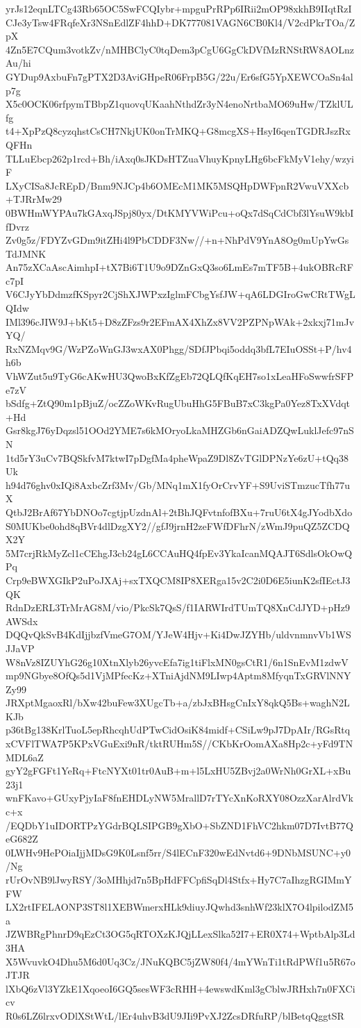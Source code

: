 yrJs12eqnLTCg43Rb65OC5SwFCQIybr+mpguPrRPp6IRii2mOP98xkhB9IIqtRzI
CJe3yTsw4FRqfeXr3NSnEdlZF4hhD+DK777081VAGN6CB0Kl4/V2cdPkrTOa/ZpX
4Zn5E7CQum3votkZv/nMHBClyC0tqDem3pCgU6GgCkDVfMzRNStRW8AOLnzAu/hi
GYDup9AxbuFn7gPTX2D3AviGHpeR06FrpB5G/22u/Er6sfG5YpXEWCOaSn4alp7g
X5c0OCK06rfpymTBbpZ1quovqUKaahNthdZr3yN4enoNrtbaMO69uHw/TZklULfg
t4+XpPzQ8cyzqhstCsCH7NkjUK0onTrMKQ+G8mcgXS+HsyI6qenTGDRJszRxQFHn
TLLuEbcp262p1rcd+Bh/iAxq0sJKDsHTZuaVhuyKpnyLHg6bcFkMyV1ehy/wzyiF
LXyCISa8JcREpD/Bnm9NJCp4b6OMEcM1MK5MSQHpDWFpnR2VwuVXXcb+TJRrMw29
0BWHmWYPAu7kGAxqJSpj80yx/DtKMYVWiPcu+oQx7dSqCdCbf3lYsuW9kbIfDvrz
Zv0g5z/FDYZvGDm9itZHi4l9PbCDDF3Nw//+n+NhPdV9YnA8Og0mUpYwGsTdJMNK
An75zXCaAscAimhpI+tX7Bi6T1U9o9DZnGxQ3so6LmEs7mTF5B+4ukOBRcRFc7pI
V6CJyYbDdmzfKSpyr2CjShXJWPxzIglmFCbgYsfJW+qA6LDGIroGwCRtTWgLQIdw
IMl396cJIW9J+bKt5+D8zZFzs9r2EFmAX4XhZx8VV2PZPNpWAk+2xkxj71mJvYQ/
RxNZMqv9G/WzPZoWnGJ3wxAX0Phgg/SDfJPbqi5oddq3bfL7EIuOSSt+P/hv4h6b
VhWZut5u9TyG6cAKwHU3QwoBxKfZgEb72QLQfKqEH7so1xLeaHFoSwwfrSFPe7zV
bSdfg+ZtQ90m1pBjuZ/ocZZoWKvRugUbuHhG5FBuB7xC3kgPa0Yez8TxXVdqt+Hd
Gsr8kgJ76yDqzsl51OOd2YME7s6kMOryoLkaMHZGb6nGaiADZQwLuklJefc97nSN
1td5rY3uCv7BQSkfvM7ktwI7pDgfMa4pheWpaZ9Dl8ZvTGlDPNzYe6zU+tQq38Uk
h94d76ghv0xIQi8AxbcZrf3Mv/Gb/MNq1mX1fyOrCrvYF+S9UviSTmzucTfh77uX
QtbJ2BrAf67YbDNOo7cgtjpUzdnAl+2tBhJQFvtnfofBXu+7ruU6tX4gJYodbXdo
S0MUKbe0ohd8qBVr4dlDzgXY2//gfJ9jrnH2zeFWfDFhrN/zWmJ9puQZ5ZCDQX2Y
5M7crjRkMyZcl1cCEhgJ3cb24gL6CCAuHQ4fpEv3YkaIcanMQAJT6SdlsOkOwQPq
Crp9eBWXGIkP2uPoJXAj+sxTXQCM8IP8XERga15v2C2i0D6E5iunK2sfIEctJ3QK
RdnDzERL3TrMrAG8M/vio/PkcSk7QsS/f1IARWIrdTUmTQ8XnCdJYD+pHz9AWSdx
DQQvQkSvB4KdIjjbzfVmeG7OM/YJeW4Hjv+Ki4DwJZYHb/uldvnmnvVb1WSJJaVP
W8nVz8IZUYhG26g10XtnXlyb26yvcEfa7ig1tiFlxMN0gsCtR1/6n1SnEvM1zdwV
mp9NGbye8OfQs5d1VjMPfecKz+XTniAjdNM9LIwp4Aptm8MfyqnTxGRVlNNYZy99
JRXptMgaoxRl/bXw42buFew3XUgcTb+a/zbJxBHsgCnIxY8qkQ5Bs+waghN2LKJb
p36tBg138KrlTuoL5epRhcqhUdPTwCidOsiK84midf+CSiLw9pJ7DpAIr/RGsRtq
xCVFlTWA7P5KPxVGuExi9nR/tktRUHm5S//CKbKrOomAXa8Hp2c+yFd9TNMDL6aZ
gyY2gFGFt1YeRq+FtcNYXt01tr0AuB+m+l5LxHU5ZBvj2a0WrNh0GrXL+xBu23j1
wnFKavo+GUxyPjyIaF8fnEHDLyNW5MrallD7rTYcXnKoRXY08OzzXarAlrdVkc+x
/EQDbY1uIDORTPzYGdrBQLSIPGB9gXbO+SbZND1FhVC2hkm07D7IvtB77QeG682Z
0LWHv9HePOiaIjjMDsG9K0Lsnf5rr/S4lECnF320wEdNvtd6+9DNbMSUNC+y0/Ng
rUrOvNB9lJwyRSY/3oMHhjd7n5BpHdFFCpfiSqDl4Stfx+Hy7C7aIhzgRGIMmYFW
LX2rtIFELAONP3ST8l1XEBWmerxHLk9diuyJQwhd3snhWf23klX7O4lpilodZM5a
JZWBRgPhnrD9qEzCt3OG5qRTOXzKJQjLLexSlka52I7+ER0X74+WptbAlp3Ld3HA
X5WvuvkO4Dhu5M6d0Uq3Cz/JNuKQBC5jZW80f4/4mYWnTi1tRdPWf1u5R67oJTJR
lXbQ6zVl3YZkE1XqoeoI6GQ5sesWF3cRHH+4ewswdKml3gCblwJRHxh7n0FXCicv
R0s6LZ6lrxvODlXStWtL/lEr4uhvB3dU9JIi9PvXJ2ZcsDRfuRP/blBetqQggtSR
